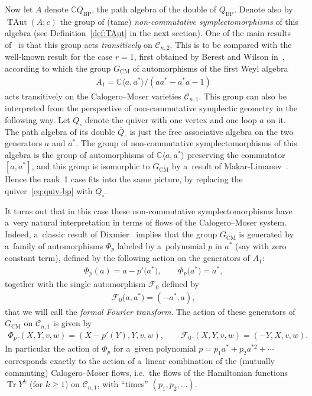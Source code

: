 \documentclass[11pt]{article}
\newcommand{\bb}[1]{\mathbb{#1}}
\newcommand{\ol}[1]{\overline{#1}}
\DeclareMathOperator{\tr}{Tr}
\DeclareMathOperator{\TAut}{TAut}
\begin{document}
Now let \(A\) denote \(\bb{C}\ol{Q}_{\mathrm{BP}}\), the path algebra of the double of \(Q_{\mathrm{BP}}\).
Denote also by \(\TAut(A;c)\) the group of (tame) \emph{non-commutative symplectomorphisms} of this algebra
(see Def\/inition~\ref{def:TAut} in the next section).
One of the main results of~\cite{bp08} is that this group acts \emph{transitively} on \(\mathcal{C}_{n,2}\).
This is to be compared with the well-known result for the case \(r=1\), f\/irst obtained by Berest and
Wilson in~\cite{bw00}, according to which the group \(G_{\mathrm{CM}}\) of automorphisms of the f\/irst
Weyl algebra
\begin{gather*}
A_{1}=\bb{C}\langle a,a^{*}\rangle/(aa^{*}-a^{*}a-1)
\end{gather*}
acts transitively on the Calogero--Moser varieties \(\mathcal{C}_{n,1}\).
This group can also be interpreted from the perspective of non-commutative symplectic geometry in the
following way.
Let \(Q_{\circ}\) denote the quiver with one vertex and one loop \(a\) on it.
The path algebra of its double \(\ol{Q}_{\circ}\) is just the free associative algebra on the two
generators \(a\) and \(a^{*}\).
The group of non-commutative symplectomorphisms of this algebra is the group of automorphisms of
\(\bb{C}\langle a,a^{*}\rangle\) preserving the commutator \([a,a^{*}]\), and this group is isomorphic to
\(G_{\mathrm{CM}}\) by a~result of Makar-Limanov~\cite{ml84, ml70}.
Hence the rank~1 case f\/its into the same picture, by replacing the quiver~\eqref{eq:quiv-bp} with
\(Q_{\circ}\).

It turns out that in this case these non-commutative symplectomorphisms have a~very natural interpretation
in terms of f\/lows of the Calogero--Moser system.
Indeed, a~classic result of Dixmier~\cite{dix68} implies that the group \(G_{\mathrm{CM}}\) is generated by
a~family of automorphisms \(\Phi_{p}\) labeled by a~polynomial \(p\) in \(a^{*}\) (say with zero constant
term), def\/ined by the following action on the generators of \(A_{1}\):
\begin{gather}
\label{eq:def-cmflows}
\Phi_{p}(a)=a-p'\big(a^{*}\big),
\qquad
\Phi_{p}\big(a^{*}\big)=a^{*},
\end{gather}
together with the single automorphism \(\mathcal{F}_{0}\) def\/ined by
\begin{gather}
\label{eq:fft0}
\mathcal{F}_{0}\big(a,a^{*}\big)=(-a^{*},a),
\end{gather}
that we will call the \emph{formal Fourier transform}.
The action of these generators of \(G_{\mathrm{CM}}\) on \(\mathcal{C}_{n,1}\) is given by
\begin{gather*}
\Phi_{p}.(X,Y,v,w)=(X-p'(Y),Y,v,w),
\qquad
\mathcal{F}_{0}.(X,Y,v,w)=(-Y,X,v,w).
\end{gather*}
In particular the action of \(\Phi_{p}\) for a~given polynomial \(p = p_{1}a^{*} + p_{2}a^{*2} + \cdots\)
corresponds exactly to the action of a~linear combination of the (mutually commuting) Calogero--Moser
f\/lows, i.e.\
the f\/lows of the Hamiltonian functions \(\tr Y^{k}\) (for \(k\geq 1\)) on \(\mathcal{C}_{n,1}\), with
``times'' \((p_{1}, p_{2}, \dots)\).
\end{document}

